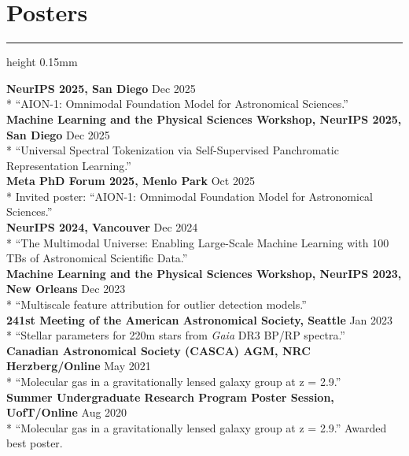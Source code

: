 \documentclass[10pt]{extarticle}
\newcommand{\hrulesp}[1]{%
  \vspace{-3.0mm}
  \hrule height 0.15mm
  \vspace{#1}
}
\begin{document}
\vspace{-3mm}
\section*{Posters}
\hrulesp{2mm}

\textbf{NeurIPS 2025, San Diego} \hfill Dec 2025 \\*
``AION-1: Omnimodal Foundation Model for Astronomical Sciences.'' \\
\textbf{Machine Learning and the Physical Sciences Workshop, NeurIPS 2025, San Diego} \hfill Dec 2025 \\*
``Universal Spectral Tokenization via Self-Supervised Panchromatic Representation Learning.'' \\
\textbf{Meta PhD Forum 2025, Menlo Park} \hfill Oct 2025 \\*
Invited poster: ``AION-1: Omnimodal Foundation Model for Astronomical Sciences.'' \\
\textbf{NeurIPS 2024, Vancouver} \hfill Dec 2024 \\*
``The Multimodal Universe: Enabling Large-Scale Machine Learning with 100 TBs of Astronomical Scientific Data.'' \\
\textbf{Machine Learning and the Physical Sciences Workshop, NeurIPS 2023, New Orleans} \hfill Dec 2023 \\*
``Multiscale feature attribution for outlier detection models.'' \\
\textbf{241st Meeting of the American Astronomical Society, Seattle} \hfill Jan 2023 \\*
``Stellar parameters for 220m stars from \textit{Gaia} DR3 BP/RP spectra.'' \\
\textbf{Canadian Astronomical Society (CASCA) AGM, NRC Herzberg/Online} \hfill May 2021 \\*
``Molecular gas in a gravitationally lensed galaxy group at z = 2.9.'' \\
\textbf{Summer Undergraduate Research Program Poster Session, UofT/Online} \hfill Aug 2020 \\*
``Molecular gas in a gravitationally lensed galaxy group at z = 2.9.'' Awarded best poster.
\end{document}
